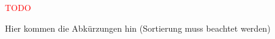\textcolor{red}{TODO}

Hier kommen die Abkürzungen hin (Sortierung muss beachtet werden)

\acronymContainer{
}
